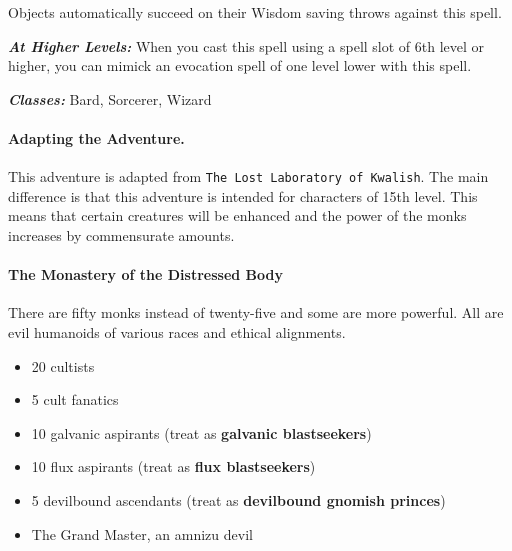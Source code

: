 Objects automatically succeed on their Wisdom saving throws against this spell.

\textbf{\textit{At Higher Levels:}} When you cast this spell using a spell slot of
6th level or higher, you can mimick an evocation spell of one level lower with this
spell.

\textbf{\textit{Classes:}} Bard, Sorcerer, Wizard

\paragraph{Adapting the Adventure.}
This adventure is adapted from \texttt{The Lost Laboratory of Kwalish}. The main
difference is that this adventure is intended for characters of 15th level. This
means that certain creatures will be enhanced and the power of the monks increases
by commensurate amounts.

\paragraph{The Monastery of the Distressed Body}
There are fifty monks instead of twenty-five and some are more powerful. All are
evil humanoids of various races and ethical alignments.

\begin{itemize}
  \item 20 cultists
  \item 5 cult fanatics
  \item 10 galvanic aspirants (treat as \textbf{galvanic blastseekers})
  \item 10 flux aspirants (treat as \textbf{flux blastseekers})
  \item 5 devilbound ascendants (treat as \textbf{devilbound gnomish princes})
  \item The Grand Master, an amnizu devil
\end{itemize}
